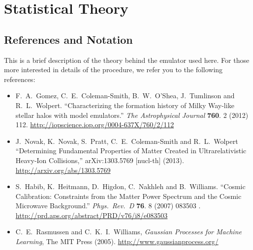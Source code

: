 \section{Statistical Theory}\label{sec:stattheory}
\subsection{References and Notation}

This is a brief description of the theory behind the emulator used here. For those more interested in details of the procedure, we refer you to the following references:
\begin{itemize}

\item F.~A.~Gomez, C.~E.~Coleman-Smith, B.~W.~O'Shea, J.~Tumlinson and R.~L.~Wolpert.
  ``Characterizing the formation history of Milky Way-like stellar halos with model emulators.''
	\emph{The Astrophysical Journal} {\bf 760}. 2 (2012) 112.
\url{http://iopscience.iop.org/0004-637X/760/2/112}

\item J.~Novak, K.~Novak, S.~Pratt, C.~E.~Coleman-Smith and R.~L.~Wolpert
  ``Determining Fundamental Properties of Matter Created in Ultrarelativistic Heavy-Ion Collisions,''
  arXiv:1303.5769 [nucl-th] (2013).
\url{http://arxiv.org/abs/1303.5769}

\item S.~Habib, K.~Heitmann, D.~Higdon, C.~Nakhleh and B.~Williams.
  ``Cosmic Calibration: Constraints from the Matter Power Spectrum and the Cosmic Microwave Background.''
  \emph{Phys.\ Rev.\ D} {\bf 76}. 8 (2007) 083503 .
\url{http://prd.aps.org/abstract/PRD/v76/i8/e083503}

\item C.~E.~Rasmussen and C.~K.~I.~Williams, \emph{Gaussian Processes for Machine Learning}, The MIT Press (2005).
\url{http://www.gaussianprocess.org/}

\end{itemize}
